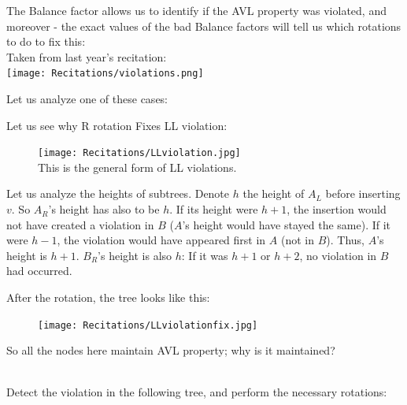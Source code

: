 
The Balance factor allows us to identify if the AVL property was violated, and moreover -
the exact values of the bad Balance factors will tell us which rotations to do to fix
this:\\
Taken from last year's recitation:\\
\texttt{[image: Recitations/violations.png]}

Let us analyze one of these cases:\\
\begin{example} Let us see why R rotation Fixes LL violation:\\
\begin{figure}[h]
  \centering
\texttt{[image: Recitations/LLviolation.jpg]}\\
This is the general form of LL violations.
\end{figure}

Let us analyze the heights of subtrees. Denote $h$ the height of $A_L$ before inserting $v$. So $A_R$'s height has also to be $h$.
If its height were $h+1$, the insertion would not have created a violation in
$B$ ($A$'s height would have stayed the same). If it were $h-1$, the violation would have appeared first in $A$ (not in $B$). Thus, $A$'s height is $h+1$.
$B_R$'s height is also $h$: If it was $h+1$ or $h+2$, no violation in $B$ had
occurred.

After the rotation, the tree looks like this:
\begin{figure}[h]
  \centering
  \texttt{[image: Recitations/LLviolationfix.jpg]}
\end{figure}
So all the nodes here maintain AVL property; why is it maintained?
\end{example}\\
Detect the violation in the following tree, and perform the necessary rotations:\\

